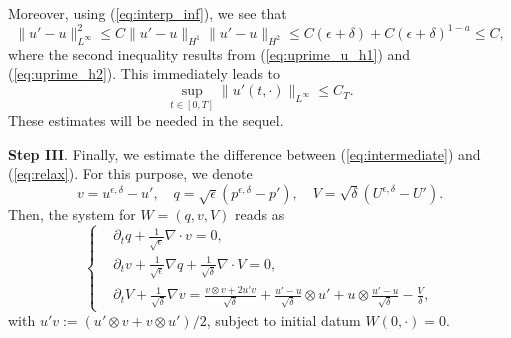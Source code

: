 \documentclass[reqno,10pt]{amsart}
\theoremstyle{definition}
\theoremstyle{remark}
\numberwithin{equation}{section}
\begin{document}
Moreover, using (\ref{eq:interp_inf}), we see that
\begin{equation} \label{eq:uprime_u_Linf}
    \|u'-u\|_{L^\infty}^2\le C\|u'-u\|_{H^1}\|u'-u\|_{H^2}
    \le C(\epsilon+\delta) + C(\epsilon+\delta)^{1-a} \le C,
\end{equation}
where the second inequality results from (\ref{eq:uprime_u_h1}) and (\ref{eq:uprime_h2}). This immediately leads to
\begin{equation} \label{eq:uprime_Linf}
    \sup_{t\in[0,T]} \|u'(t,\cdot)\|_{L^\infty} \le C_T.
\end{equation}
These estimates will be needed in the sequel.

\textbf{Step III}. Finally, we estimate the difference between (\ref{eq:intermediate}) and (\ref{eq:relax}). For this purpose, we denote
\[
    v = u^{\epsilon,\delta}-u', \quad
    q = \sqrt{\epsilon}\left(p^{\epsilon,\delta}-p'\right), \quad
    V = \sqrt{\delta}\left(U^{\epsilon,\delta}-U'\right).
\]
Then, the system for $W=(q,v,V)$ reads as
\[
\left\{
\begin{aligned}
    &\partial_t q + \frac{1}{\sqrt{\epsilon}}\nabla\cdot v=0, \\
    &\partial_t v + \frac{1}{\sqrt{\epsilon}}\nabla q + \frac{1}{\sqrt{\delta}}\nabla\cdot V = 0, \\
    &\partial_t V + \frac{1}{\sqrt{\delta}}\nabla v = \frac{v\otimes v+2u'v}{\sqrt\delta} + \frac{u'-u}{\sqrt\delta}\otimes u' + u\otimes \frac{u'-u}{\sqrt\delta}-\frac{V}{\delta},
\end{aligned}
\right.
\]
with $u'v:=(u'\otimes v+v\otimes u')/2$, subject to initial datum $W(0,\cdot)=0$.
\end{document}
